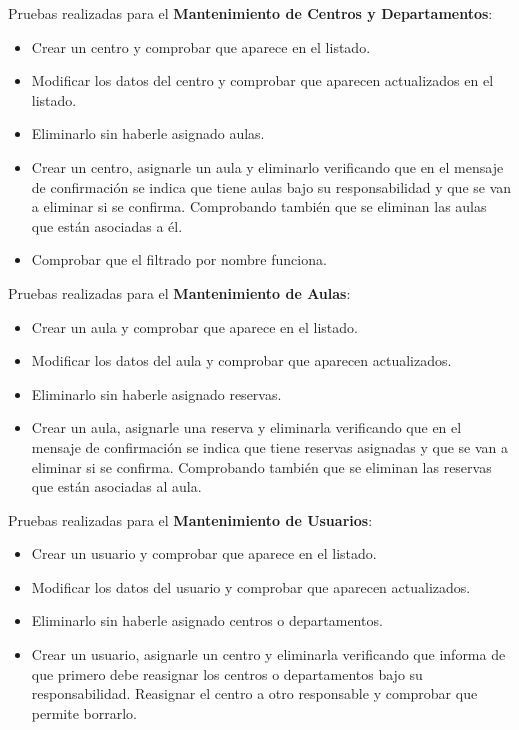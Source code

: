 Pruebas realizadas para el \textbf{Mantenimiento de Centros y Departamentos}:
\begin{itemize}
    \item Crear un centro y comprobar que aparece en el listado.
    \item Modificar los datos del centro y comprobar que aparecen actualizados en el listado.
    \item Eliminarlo sin haberle asignado aulas.
    \item Crear un centro, asignarle un aula y eliminarlo verificando que en el mensaje de confirmación se indica que tiene aulas bajo su responsabilidad y que se van a eliminar si se confirma. Comprobando también que se eliminan las aulas que están asociadas a él.
    \item Comprobar que el filtrado por nombre funciona.
\end{itemize}

Pruebas realizadas para el \textbf{Mantenimiento de Aulas}:
\begin{itemize}
    \item Crear un aula y comprobar que aparece en el listado.
    \item Modificar los datos del aula y comprobar que aparecen actualizados.
    \item Eliminarlo sin haberle asignado reservas.
    \item Crear un aula, asignarle una reserva y eliminarla verificando que en el mensaje de confirmación se indica que tiene reservas asignadas y que se van a eliminar si se confirma. Comprobando también que se eliminan las reservas que están asociadas al aula.
\end{itemize}

Pruebas realizadas para el \textbf{Mantenimiento de Usuarios}:
\begin{itemize}
    \item Crear un usuario y comprobar que aparece en el listado.
    \item Modificar los datos del usuario y comprobar que aparecen actualizados.
    \item Eliminarlo sin haberle asignado centros o departamentos.
    \item Crear un usuario, asignarle un centro y eliminarla verificando que informa de que primero debe reasignar los centros o departamentos bajo su responsabilidad. Reasignar el centro a otro responsable y comprobar que permite borrarlo.
\end{itemize}

